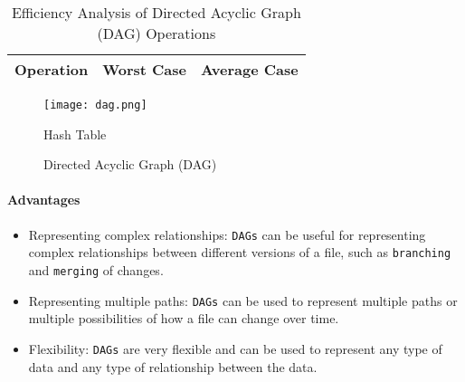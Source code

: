 \begin{table}[h]
    \centering
    \caption{Efficiency Analysis of Directed Acyclic Graph (DAG) Operations}
    \label{tab:dag-efficiency-analysis}
    \begin{tabular}{|c|c|c|}
        \hline
        Operation & Worst Case & Average Case \\ \hline
    \end{tabular}
\end{table}
\begin{figure}[!htbp]
    \centering
    \texttt{[image: dag.png]}
    \caption{Hash Table \cite{stemmler_2022}}
    \caption{Directed Acyclic Graph (DAG) \cite{surti_2016}}
    \label{fig:dag}
\end{figure}
\newpage

\paragraph{Advantages}
\begin{itemize}
    \item Representing complex relationships: \lstinline{DAGs} can be useful for representing complex relationships between different versions of a file, such as \lstinline{branching} and \lstinline{merging} of changes.
    \item Representing multiple paths: \lstinline{DAGs} can be used to represent multiple paths or multiple possibilities of how a file can change over time.
    \item Flexibility: \lstinline{DAGs} are very flexible and can be used to represent any type of data and any type of relationship between the data.
\end{itemize}
